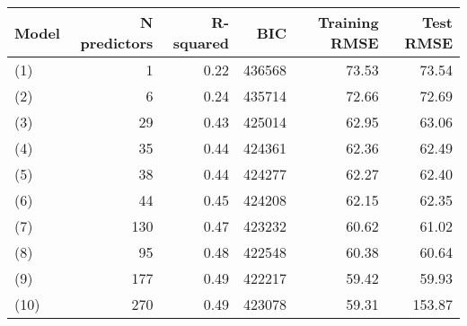 \begin{tabular}{lrrrrr}
  \toprule
Model & N predictors & R-squared & BIC & Training RMSE & Test RMSE \\ 
  \midrule
(1) & 1 & 0.22 & 436568 & 73.53 & 73.54 \\ 
  (2) & 6 & 0.24 & 435714 & 72.66 & 72.69 \\ 
  (3) & 29 & 0.43 & 425014 & 62.95 & 63.06 \\ 
  (4) & 35 & 0.44 & 424361 & 62.36 & 62.49 \\ 
  (5) & 38 & 0.44 & 424277 & 62.27 & 62.40 \\ 
  (6) & 44 & 0.45 & 424208 & 62.15 & 62.35 \\ 
  (7) & 130 & 0.47 & 423232 & 60.62 & 61.02 \\ 
  (8) & 95 & 0.48 & 422548 & 60.38 & 60.64 \\ 
  (9) & 177 & 0.49 & 422217 & 59.42 & 59.93 \\ 
  (10) & 270 & 0.49 & 423078 & 59.31 & 153.87 \\ 
   \bottomrule
\end{tabular}

